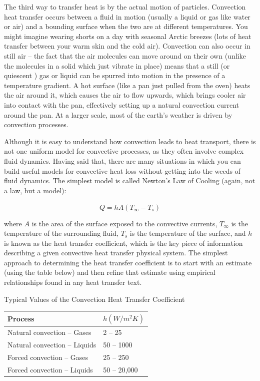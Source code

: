 The third way to transfer heat is by the actual motion of particles. Convection heat transfer occurs between a fluid in motion (usually a liquid or gas like water or air) and a bounding surface when the two are at different temperatures. You might imagine wearing shorts on a day with seasonal Arctic breezes (lots of heat transfer between your warm skin and the cold air). Convection can also occur in still air -- the fact that the air molecules can move around on their own (unlike the molecules in a solid which just vibrate in place) means that a still (or quiescent ) gas or liquid can be spurred into motion in the presence of a temperature gradient. A hot surface (like a pan just pulled from the oven) heats the air around it, which causes the air to flow upwards, which brings cooler air into contact with the pan, effectively setting up a natural convection current around the pan. At a larger scale, most of the earth's weather is driven by convection processes.

Although it is easy to understand how convection leads to heat transport, there is not one uniform model for convective processes, as they often involve complex fluid dynamics.  Having said that, there are many situations in which you can build useful models for convective heat loss without getting into the weeds of fluid dynamics. The simplest model is called Newton's Law of Cooling (again, not a law, but a model):

$$ \dot Q=hA(T_\infty-T_s) $$

where $A$ is the area of the surface exposed to the convective currents, $T_\infty$ is the temperature of the surrounding fluid, $T_s$ is the temperature of the surface, and $h$ is known as the heat transfer coefficient, which is the key piece of information describing a given convective heat transfer physical system. The simplest approach to determining the heat transfer coefficient is to start with an estimate (using the table below) and then refine that estimate using empirical relationships found in any heat transfer text.

\begin{center}
Typical Values of the Convection Heat Transfer Coefficient 
\begin{tabular}{ | p{5cm} | p{2cm} | }
\hline
Process & $h (W/m^2 K) $\\
\hline
Natural convection -- Gases & 2 -- 25 \\
\hline
Natural convection -- Liquids & 50 -- 1000 \\
\hline
Forced convection -- Gases & 25 -- 250 \\
\hline
Forced convection -- Liquids & 50 -- 20,000 \\
\hline
\end{tabular}
\end{center}

